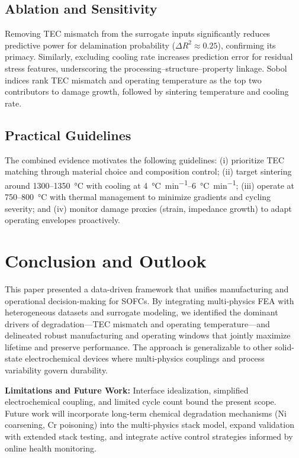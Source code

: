 \documentclass[conference]{IEEEtran}
\begin{document}
\subsection{Ablation and Sensitivity}
Removing TEC mismatch from the surrogate inputs significantly reduces predictive power for delamination probability (\(\Delta R^2 \approx 0.25\)), confirming its primacy. Similarly, excluding cooling rate increases prediction error for residual stress features, underscoring the processing–structure–property linkage. Sobol indices rank TEC mismatch and operating temperature as the top two contributors to damage growth, followed by sintering temperature and cooling rate.

\subsection{Practical Guidelines}
The combined evidence motivates the following guidelines: (i) prioritize TEC matching through material choice and composition control; (ii) target sintering around \SI{1300}{}–\SI{1350}{\celsius} with cooling at \SIrange{4}{6}{\celsius\per\minute}; (iii) operate at \SI{750}{}–\SI{800}{\celsius} with thermal management to minimize gradients and cycling severity; and (iv) monitor damage proxies (strain, impedance growth) to adapt operating envelopes proactively.

\section{Conclusion and Outlook} \label{sec:conclusion}
This paper presented a data-driven framework that unifies manufacturing and operational decision-making for SOFCs. By integrating multi-physics FEA with heterogeneous datasets and surrogate modeling, we identified the dominant drivers of degradation—TEC mismatch and operating temperature—and delineated robust manufacturing and operating windows that jointly maximize lifetime and preserve performance. The approach is generalizable to other solid-state electrochemical devices where multi-physics couplings and process variability govern durability.

\textbf{Limitations and Future Work:} Interface idealization, simplified electrochemical coupling, and limited cycle count bound the present scope. Future work will incorporate long-term chemical degradation mechanisms (Ni coarsening, Cr poisoning) into the multi-physics stack model, expand validation with extended stack testing, and integrate active control strategies informed by online health monitoring.
\end{document}
